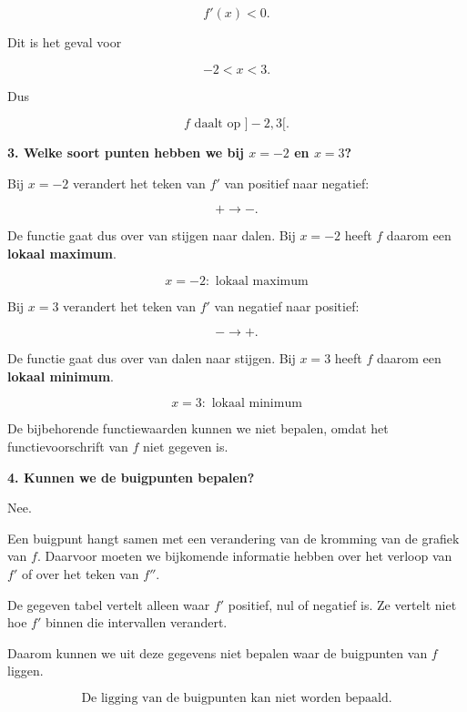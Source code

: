 \documentclass{ximera}
\begin{document}
\begin{oefening}{\oefU\ESS}
\begin{oplossing}
  \[
  f'(x)<0.
  \]
  
  Dit is het geval voor
  
  \[
  -2<x<3.
  \]
  
  Dus
  
  \[
  \boxed{
  f \text{ daalt op }]-2,3[.
  }
  \]
  
  \textbf{3. Welke soort punten hebben we bij $x=-2$ en $x=3$?}
  
  Bij $x=-2$ verandert het teken van $f'$ van positief naar negatief:
  
  \[
  +\longrightarrow-.
  \]
  
  De functie gaat dus over van stijgen naar dalen.
  Bij $x=-2$ heeft $f$ daarom een \textbf{lokaal maximum}.
  
  \[
  \boxed{x=-2:\text{ lokaal maximum}}
  \]
  
  Bij $x=3$ verandert het teken van $f'$ van negatief naar positief:
  
  \[
  -\longrightarrow+.
  \]
  
  De functie gaat dus over van dalen naar stijgen.
  Bij $x=3$ heeft $f$ daarom een \textbf{lokaal minimum}.
  
  \[
  \boxed{x=3:\text{ lokaal minimum}}
  \]
  
  De bijbehorende functiewaarden kunnen we niet bepalen, omdat het
  functievoorschrift van $f$ niet gegeven is.
  
  \textbf{4. Kunnen we de buigpunten bepalen?}
  
  Nee.
  
  Een buigpunt hangt samen met een verandering van de kromming van de
  grafiek van $f$. Daarvoor moeten we bijkomende informatie hebben over
  het verloop van $f'$ of over het teken van $f''$.
  
  De gegeven tabel vertelt alleen waar $f'$ positief, nul of negatief is.
  Ze vertelt niet hoe $f'$ binnen die intervallen verandert.
  
  Daarom kunnen we uit deze gegevens niet bepalen waar de buigpunten
  van $f$ liggen.
  
  \[
  \boxed{
  \text{De ligging van de buigpunten kan niet worden bepaald.}
  }
  \]
  
  \end{oplossing}

\end{oefening}


\end{document}
